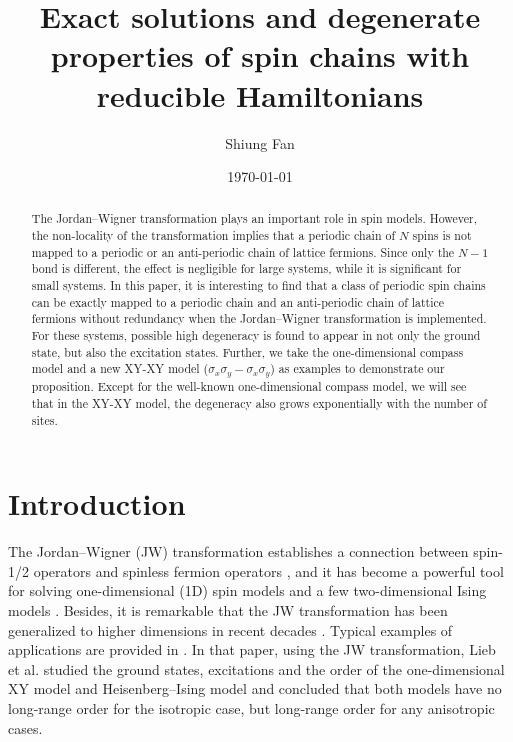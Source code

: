 \documentclass[twocolumn,floats,superscriptaddress]{revtex4}
\begin{document}
\title{ Exact solutions and degenerate properties of spin chains with reducible Hamiltonians}
\date{\today }
\author{Shiung Fan}


\begin{abstract}
The Jordan--Wigner transformation plays an important role in spin models.
However, the non-locality of the transformation implies that a periodic chain of {$N$}
 spins is not mapped to a periodic or an anti-periodic chain of lattice fermions. Since only the $N-1$ bond is different, the effect is negligible for large systems, while it is significant for small systems. In this paper, it is interesting to find that a class of periodic spin chains can be exactly mapped to a periodic chain and an anti-periodic chain of lattice fermions without redundancy when the Jordan--Wigner transformation is implemented. For these systems, possible high degeneracy is found to appear in not only the ground state, but also the excitation states. {Further, we take the one-dimensional compass model and a new XY-XY model ($\sigma_x\sigma_y-\sigma_x\sigma_y$) as examples to demonstrate our {proposition}. Except for the well-known one-dimensional compass model, we will see that in the XY-XY model, the degeneracy also grows exponentially with the number of sites.}

\end{abstract}


\maketitle

\section{Introduction}
The Jordan--Wigner (JW) transformation establishes a connection between spin-1/2 operators and spinless fermion operators \cite{Jordan1928}, and it has become a powerful tool for solving one-dimensional (1D) spin models and {a few two-dimensional Ising models} \cite{Mattis,Lieb1961,Schultz1964}.
Besides, it is remarkable that {the} JW transformation has been generalized to higher dimensions in recent decades \cite{Fradkin1989,Wang1992-1,Wang1992-2,Wang1992-3,Azzouz1993,Huerta1993,Kochmanski1995,Batista2001,Bock2001}. {Typical examples of applications are provided in \cite{Lieb1961}. In that paper, using the JW transformation, Lieb et al. studied the ground states, excitations and the order of the one-dimensional XY model and Heisenberg--Ising model and concluded that both models have no long-range order for the isotropic case, but long-range order for any anisotropic cases.}
\end{document}
